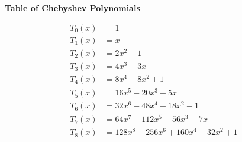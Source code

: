 \documentclass[11pt]{article}
\begin{document}
\bigskip
\begin{center} \bf Table of Chebyshev Polynomials \end{center}

\begin{align*}
T_0(x) &= 1\\
T_1(x) &= x \\
T_2(x) &= 2x^2   - 1 \\
T_3(x) &= 4x^3   - 3x \\
T_4(x) &= 8x^4   - 8x^2   + 1 \\
T_5(x) &= 16x^5  - 20x^3  + 5x \\
T_6(x) &= 32 x^6 - 48x^4  + 18x^2  - 1 \\
T_7(x) &= 64 x^7 - 112x^5 + 56x^3  - 7x \\
T_8(x) &= 128x^8 - 256x^6 + 160x^4 - 32x^2 + 1
\end{align*}
\end{document}
